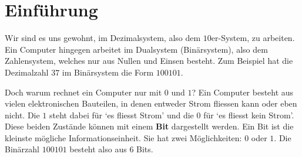 \newpage



\tableofcontents

\newpage





\section{Einführung}

Wir sind es uns gewohnt, im Dezimalsystem, also dem $10$er-System, zu arbeiten. Ein Computer hingegen arbeitet im Dualsystem (Binärsystem), also dem Zahlensystem, welches nur aus Nullen und Einsen besteht. Zum Beispiel hat die Dezimalzahl $37$ im Binärsystem die Form $100101$.

Doch warum rechnet ein Computer nur mit $0$ und $1$? Ein Computer besteht aus vielen elektronischen Bauteilen, in denen entweder Strom fliessen kann oder eben nicht. Die $1$ steht dabei für `es fliesst Strom' und die $0$ für `es fliesst kein Strom'.
Diese beiden Zustände können mit einem \textbf{Bit} dargestellt werden. Ein Bit ist die kleinste mögliche Informationseinheit. Sie hat zwei Möglichkeiten: $0$ oder $1$.
Die Binärzahl $100101$ besteht also aus $6$ Bits.

